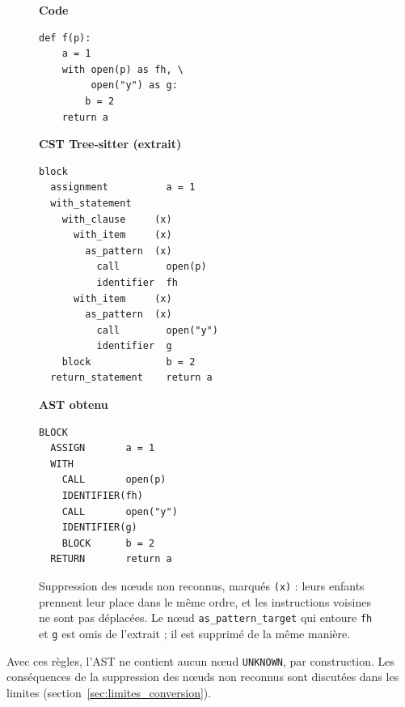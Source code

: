 \documentclass[12pt,a4paper,oneside]{report}
\begin{document}
\begin{figure}[htbp]
\centering
\small
\begin{minipage}[t]{0.30\textwidth}
\textbf{Code}
\begin{verbatim}
def f(p):
    a = 1
    with open(p) as fh, \
         open("y") as g:
        b = 2
    return a
\end{verbatim}
\end{minipage}\hfill
\begin{minipage}[t]{0.36\textwidth}
\textbf{CST Tree-sitter (extrait)}
\footnotesize
\begin{verbatim}
block
  assignment          a = 1
  with_statement
    with_clause     (x)
      with_item     (x)
        as_pattern  (x)
          call        open(p)
          identifier  fh
      with_item     (x)
        as_pattern  (x)
          call        open("y")
          identifier  g
    block             b = 2
  return_statement    return a
\end{verbatim}
\end{minipage}\hfill
\begin{minipage}[t]{0.30\textwidth}
\textbf{AST obtenu}
\begin{verbatim}
BLOCK
  ASSIGN       a = 1
  WITH
    CALL       open(p)
    IDENTIFIER(fh)
    CALL       open("y")
    IDENTIFIER(g)
    BLOCK      b = 2
  RETURN       return a
\end{verbatim}
\end{minipage}
\caption{Suppression des nœuds non reconnus, marqués \texttt{(x)} : leurs
enfants prennent leur place dans le même ordre, et les instructions voisines
ne sont pas déplacées. Le nœud \texttt{as\_pattern\_target} qui entoure
\texttt{fh} et \texttt{g} est omis de l'extrait ; il est supprimé de la même
manière.}
\label{fig:unknown_splice}
\end{figure}

Avec ces règles, l'AST ne contient aucun nœud \texttt{UNKNOWN}, par
construction. Les conséquences de la suppression des nœuds non reconnus sont
discutées dans les limites (section~\ref{sec:limites_conversion}).
\end{document}
